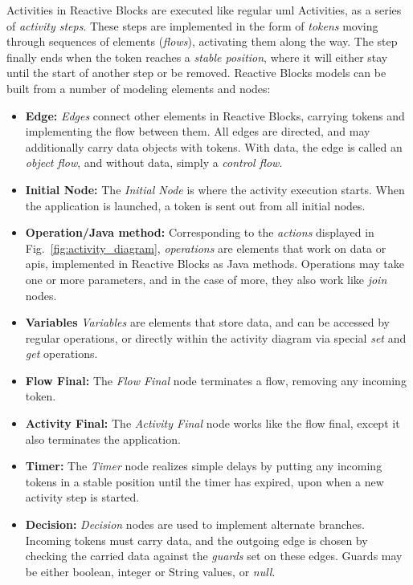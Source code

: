 \noindent
Activities in Reactive Blocks are executed like regular \gls{uml} Activities, as a series of \emph{activity steps}. These steps are implemented in the form of \emph{tokens} moving through sequences of elements (\emph{flows}), activating them along the way. The step finally ends when the token reaches a \emph{stable position}, where it will either stay until the start of another step or be removed. Reactive Blocks models can be built from a number of modeling elements and nodes:

\begin{itemize}
	\item{\textbf{Edge:}} \emph{Edges} connect other elements in Reactive Blocks, carrying tokens and implementing the flow between them. All edges are directed, and may additionally carry data objects with tokens. With data, the edge is called an \emph{object flow}, and without data, simply a \emph{control flow}.
	\item{\textbf{Initial Node:}} The \emph{Initial Node} is where the activity execution starts. When the application is launched, a token is sent out from all initial nodes.
	\item{\textbf{Operation/Java method:}} Corresponding to the \emph{actions} displayed in Fig.~\ref{fig:activity_diagram}, \emph{operations} are elements that work on data or \glspl{api}, implemented in Reactive Blocks as Java methods. Operations may take one or more parameters, and in the case of more, they also work like \emph{join} nodes.
	\item{\textbf{Variables}} \emph{Variables} are elements that store data, and can be accessed by regular operations, or directly within the activity diagram via special \emph{set} and \emph{get} operations.
	\item{\textbf{Flow Final:}} The \emph{Flow Final} node terminates a flow, removing any incoming token.
	\item{\textbf{Activity Final:}} The \emph{Activity Final} node works like the flow final, except it also terminates the application.
	\item{\textbf{Timer:}} The \emph{Timer} node realizes simple delays by putting any incoming tokens in a stable position until the timer has expired, upon when a new activity step is started.
	\item{\textbf{Decision:}} \emph{Decision} nodes are used to implement alternate branches. Incoming tokens must carry data, and the outgoing edge is chosen by checking the carried data against the \emph{guards} set on these edges. Guards may be either boolean, integer or String values, or \emph{null}.

\end{itemize}
